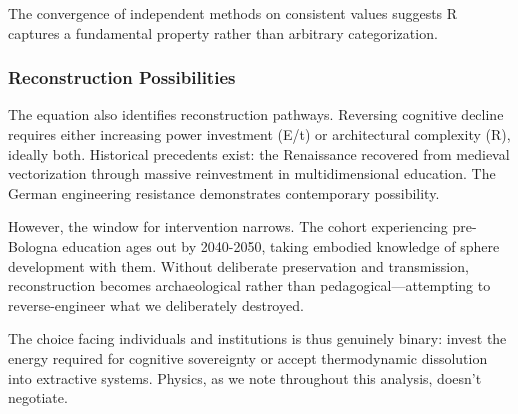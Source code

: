 The convergence of independent methods on consistent values suggests R captures a fundamental property rather than arbitrary categorization.

\subsubsection{Reconstruction Possibilities}

The equation also identifies reconstruction pathways. Reversing cognitive decline requires either increasing power investment (E/t) or architectural complexity (R), ideally both. Historical precedents exist: the Renaissance recovered from medieval vectorization through massive reinvestment in multidimensional education. The German engineering resistance demonstrates contemporary possibility.

However, the window for intervention narrows. The cohort experiencing pre-Bologna education ages out by 2040-2050, taking embodied knowledge of sphere development with them. Without deliberate preservation and transmission, reconstruction becomes archaeological rather than pedagogical---attempting to reverse-engineer what we deliberately destroyed.

The choice facing individuals and institutions is thus genuinely binary: invest the energy required for cognitive sovereignty or accept thermodynamic dissolution into extractive systems. Physics, as we note throughout this analysis, doesn't negotiate.